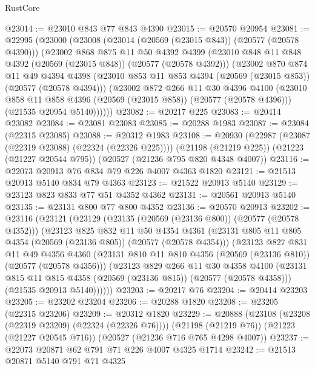 \begin{lexlean}{RustCore}
\begin{coremodule}
@23014 := @23010 @843 @77 @843 @4390
@23015 := @20570 @20954
@23081 := @22995
    (@23000
      (@23008
        (@23014 (@20569 (@23015 @843)) (@20577 (@20578 @4390)))
        (@23002
          @868
          @875
          @11
          @50
          @4392
          @4399
          (@23010 @848 @11 @848 @4392 (@20569 (@23015 @848)) (@20577 (@20578 @4392)))
          (@23002
            @870
            @874
            @11
            @49
            @4394
            @4398
            (@23010 @853 @11 @853 @4394 (@20569 (@23015 @853)) (@20577 (@20578 @4394)))
            (@23002
              @872
              @266
              @11
              @30
              @4396
              @4100
              (@23010 @858 @11 @858 @4396 (@20569 (@23015 @858)) (@20577 (@20578 @4396)))
              (@21535 @20954 @5140))))))
@23082 := @20217 @225
@23083 := @20414 @23082
@23084 := @23081 @23083
@23085 := @20288 @1983
@23087 := @23084 (@22315 @23085)
@23088 := @20312 @1983
@23108 := @20930
    (@22987 (@23087 (@22319 @23088) (@22324 (@22326 @225))))
    (@21198 (@21219 @225))
    (@21223 (@21227 @20544 @795))
    (@20527 (@21236 @795 @820 @4348 @4007))
@23116 := @22073 @20913 @76 @834 @79 @226 @4007 @4363 @1820
@23121 := @21513 @20913 @5140 @834 @79 @4363
@23123 := @21522 @20913 @5140
@23129 := @23123 @823 @833 @77 @51 @4352 @4362
@23131 := @20561 @20913 @5140
@23135 := @23131 @800 @77 @800 @4352
@23136 := @20570 @20913
@23202 := @23116
    (@23121
      (@23129
        (@23135 (@20569 (@23136 @800)) (@20577 (@20578 @4352)))
        (@23123
          @825
          @832
          @11
          @50
          @4354
          @4361
          (@23131 @805 @11 @805 @4354 (@20569 (@23136 @805)) (@20577 (@20578 @4354)))
          (@23123
            @827
            @831
            @11
            @49
            @4356
            @4360
            (@23131 @810 @11 @810 @4356 (@20569 (@23136 @810)) (@20577 (@20578 @4356)))
            (@23123
              @829
              @266
              @11
              @30
              @4358
              @4100
              (@23131 @815 @11 @815 @4358 (@20569 (@23136 @815)) (@20577 (@20578 @4358)))
              (@21535 @20913 @5140))))))
@23203 := @20217 @76
@23204 := @20414 @23203
@23205 := @23202 @23204
@23206 := @20288 @1820
@23208 := @23205 (@22315 @23206)
@23209 := @20312 @1820
@23229 := @20888
    (@23108 (@23208 (@22319 @23209) (@22324 (@22326 @76))))
    (@21198 (@21219 @76))
    (@21223 (@21227 @20545 @716))
    (@20527 (@21236 @716 @765 @4298 @4007))
@23237 := @22073 @20871 @62 @791 @71 @226 @4007 @4325 @1714
@23242 := @21513 @20871 @5140 @791 @71 @4325

\end{coremodule}
\end{lexlean}
